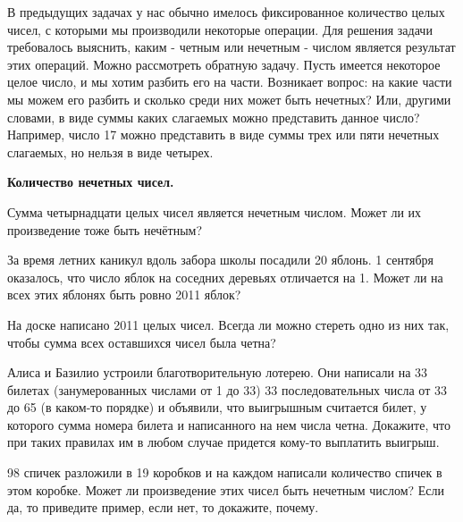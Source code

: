В предыдущих задачах у нас обычно имелось фиксированное количество целых чисел, с которыми мы производили некоторые операции. Для решения задачи требовалось выяснить, каким - четным или нечетным - числом является результат этих операций. Можно рассмотреть обратную задачу. Пусть имеется некоторое целое число, и мы хотим разбить его на части. Возникает вопрос: на какие части мы можем его разбить и сколько среди них может быть нечетных? Или, другими словами, в виде суммы каких слагаемых можно представить данное число? Например, число 17 можно представить в виде суммы трех или пяти нечетных слагаемых, но нельзя в виде четырех.

\begin{center}
	\large\textbf{Количество нечетных чисел.}
\end{center}

\begin{thm}
	Сумма четырнадцати целых чисел является нечетным числом. Может ли их произведение тоже быть нечётным?
\end{thm}


\begin{thm}
	За время летних каникул вдоль забора школы посадили 20 яблонь. 1 сентября оказалось, что число яблок на соседних деревьях отличается на 1. Может ли на всех этих яблонях быть ровно 2011 яблок?
\end{thm}

\begin{thm}\label{1.7}
	На доске написано 2011 целых чисел. Всегда ли можно стереть одно из них так, чтобы сумма всех оставшихся чисел была четна?
\end{thm}
\begin{thm}\label{1.8}	Алиса и Базилио устроили благотворительную лотерею. Они написали на 33 билетах (занумерованных числами от 1 до 33) 33 последовательных числа от 33 до 65 (в каком-то порядке) и объявили, что выигрышным считается билет, у которого сумма номера билета и написанного на нем числа четна. Докажите, что при таких правилах им в любом случае придется кому-то выплатить выигрыш.
\end{thm}
\begin{thm}\label{an4.1}	98 спичек разложили в 19 коробков и на каждом написали количество спичек в этом коробке. Может ли произведение этих чисел быть нечетным числом? Если да, то приведите пример, если нет, то докажите, почему.
\end{thm}

